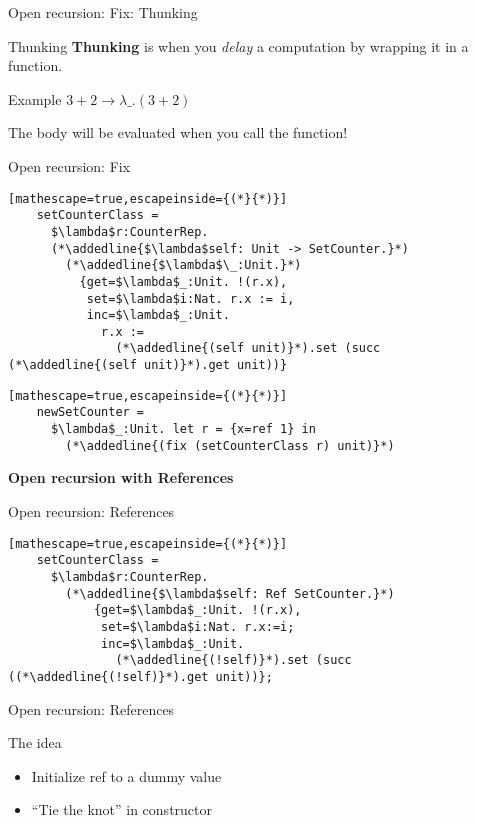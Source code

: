 \documentclass[presentation,xcolor=svgnames]{beamer}
\newcommand{\sectionframe}[1]{
  \begin{frame}
    \centering
    \huge \usebeamercolor[fg]{structure} \textbf{#1}
  \end{frame}
}
\begin{document}
\begin{frame}[fragile]{Open recursion: Fix: Thunking}
  \begin{block}{Thunking}
  \textbf{Thunking} is when you \emph{delay} a computation by wrapping it in a function.
  \end{block}

  \begin{block}{Example}
  $3 + 2 \rightarrow \lambda \_. (3 + 2)$

  The body will be evaluated when you call the function!
  \end{block}


\end{frame}

\begin{frame}[fragile]{Open recursion: Fix}
  \begin{lstlisting}[mathescape=true,escapeinside={(*}{*)}]
    setCounterClass =
      $\lambda$r:CounterRep.
      (*\addedline{$\lambda$self: Unit -> SetCounter.}*)
        (*\addedline{$\lambda$\_:Unit.}*)
          {get=$\lambda$_:Unit. !(r.x),
           set=$\lambda$i:Nat. r.x := i,
           inc=$\lambda$_:Unit.
             r.x :=
               (*\addedline{(self unit)}*).set (succ (*\addedline{(self unit)}*).get unit))}
  \end{lstlisting}
  \begin{lstlisting}[mathescape=true,escapeinside={(*}{*)}]
    newSetCounter =
      $\lambda$_:Unit. let r = {x=ref 1} in
        (*\addedline{(fix (setCounterClass r) unit)}*)
  \end{lstlisting}
\end{frame}

\sectionframe{Open recursion with References}

\begin{frame}[fragile]{Open recursion: References}
  \begin{lstlisting}[mathescape=true,escapeinside={(*}{*)}]
    setCounterClass =
      $\lambda$r:CounterRep.
        (*\addedline{$\lambda$self: Ref SetCounter.}*)
            {get=$\lambda$_:Unit. !(r.x),
             set=$\lambda$i:Nat. r.x:=i;
             inc=$\lambda$_:Unit.
               (*\addedline{(!self)}*).set (succ ((*\addedline{(!self)}*).get unit))};
  \end{lstlisting}
\end{frame}

\begin{frame}{Open recursion: References}
  \begin{block}{The idea}
    \begin{itemize}
    \item Initialize ref to a dummy value
    \item ``Tie the knot'' in constructor
    \end{itemize}
  \end{block}
\end{frame}
\end{document}
